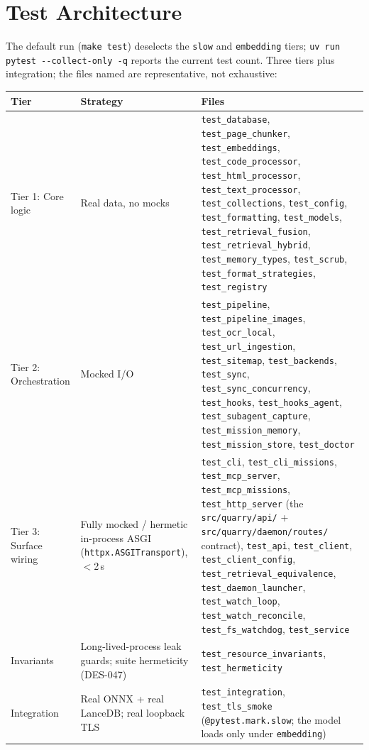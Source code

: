 \documentclass[a4paper,10pt]{article}
\newcommand{\modpath}[1]{\texttt{src/quarry/#1}}
\begin{document}
\section{Test Architecture}

The default run (\texttt{make test}) deselects the \texttt{slow} and
\texttt{embedding} tiers; \texttt{uv run pytest -{}-collect-only -q}
reports the current test count.  Three tiers plus integration; the files
named are representative, not exhaustive:

\begin{center}
\begin{tabular}{lp{5cm}p{5cm}}
\toprule
\textbf{Tier} & \textbf{Strategy} & \textbf{Files} \\
\midrule
Tier 1: Core logic & Real data, no mocks & \texttt{test\_database},
  \texttt{test\_page\_chunker}, \texttt{test\_embeddings},
  \texttt{test\_code\_processor}, \texttt{test\_html\_processor},
  \texttt{test\_text\_processor}, \texttt{test\_collections},
  \texttt{test\_config}, \texttt{test\_formatting},
  \texttt{test\_models}, \texttt{test\_retrieval\_fusion},
  \texttt{test\_retrieval\_hybrid}, \texttt{test\_memory\_types},
  \texttt{test\_scrub}, \texttt{test\_format\_strategies},
  \texttt{test\_registry} \\
Tier 2: Orchestration & Mocked I/O & \texttt{test\_pipeline},
  \texttt{test\_pipeline\_images},
  \texttt{test\_ocr\_local}, \texttt{test\_url\_ingestion},
  \texttt{test\_sitemap}, \texttt{test\_backends},
  \texttt{test\_sync}, \texttt{test\_sync\_concurrency},
  \texttt{test\_hooks}, \texttt{test\_hooks\_agent},
  \texttt{test\_subagent\_capture}, \texttt{test\_mission\_memory},
  \texttt{test\_mission\_store}, \texttt{test\_doctor} \\
Tier 3: Surface wiring & Fully mocked / hermetic in-process ASGI
  (\texttt{httpx.ASGITransport}), $<$2\,s &
  \texttt{test\_cli}, \texttt{test\_cli\_missions},
  \texttt{test\_mcp\_server}, \texttt{test\_mcp\_missions},
  \texttt{test\_http\_server} (the \modpath{api/} +
  \modpath{daemon/routes/} contract), \texttt{test\_api},
  \texttt{test\_client}, \texttt{test\_client\_config},
  \texttt{test\_retrieval\_equivalence},
  \texttt{test\_daemon\_launcher}, \texttt{test\_watch\_loop},
  \texttt{test\_watch\_reconcile}, \texttt{test\_fs\_watchdog},
  \texttt{test\_service} \\
Invariants & Long-lived-process leak guards; suite hermeticity
  (DES-047) & \texttt{test\_resource\_invariants},
  \texttt{test\_hermeticity} \\
Integration & Real ONNX + real LanceDB; real loopback TLS &
  \texttt{test\_integration}, \texttt{test\_tls\_smoke}
  (\texttt{@pytest.mark.slow}; the model loads only under
  \texttt{embedding}) \\
\bottomrule
\end{tabular}
\end{center}
\end{document}
